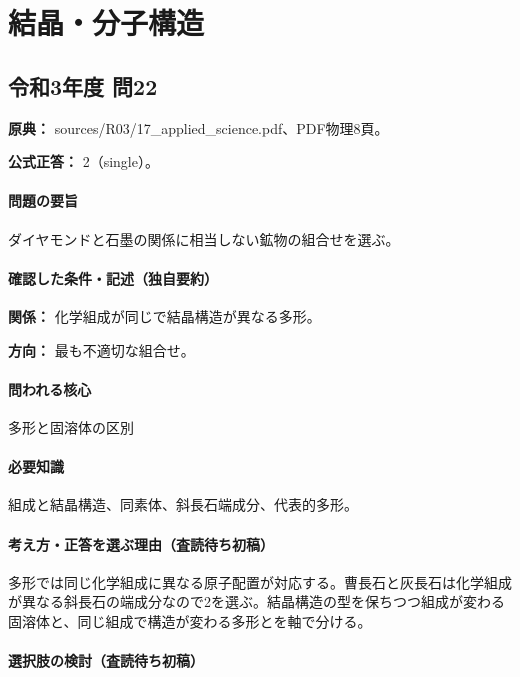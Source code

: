 \section{結晶・分子構造}

\subsection{令和3年度 問22}
\label{q:r03-reg-applied-22}

\noindent\textbf{原典：} sources/R03/17\_applied\_science.pdf、PDF物理8頁。

\textbf{公式正答：} 2（single）。

\paragraph{問題の要旨} ダイヤモンドと石墨の関係に相当しない鉱物の組合せを選ぶ。

\paragraph{確認した条件・記述（独自要約）}\mbox{}\par

\noindent\textbf{関係：} 化学組成が同じで結晶構造が異なる多形。\par

\noindent\textbf{方向：} 最も不適切な組合せ。\par

\paragraph{問われる核心} 多形と固溶体の区別

\paragraph{必要知識} 組成と結晶構造、同素体、斜長石端成分、代表的多形。

\paragraph{考え方・正答を選ぶ理由（査読待ち初稿）} 多形では同じ化学組成に異なる原子配置が対応する。曹長石と灰長石は化学組成が異なる斜長石の端成分なので2を選ぶ。結晶構造の型を保ちつつ組成が変わる固溶体と、同じ組成で構造が変わる多形とを軸で分ける。

\paragraph{選択肢の検討（査読待ち初稿）}\mbox{}\par

